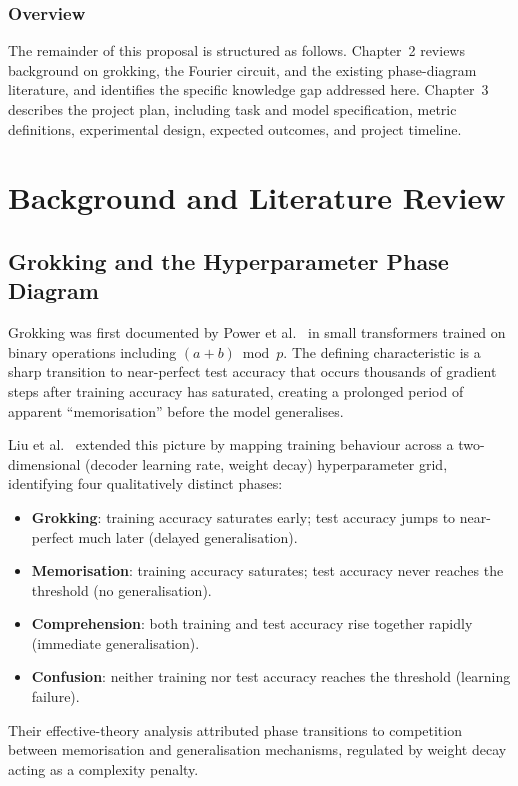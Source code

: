 \documentclass[12pt,openany,a4paper]{book}
\begin{document}
\subsection{Overview}

The remainder of this proposal is structured as follows.
Chapter~2 reviews background on grokking, the Fourier circuit, and
the existing phase-diagram literature, and identifies the specific
knowledge gap addressed here.
Chapter~3 describes the project plan, including task and model
specification, metric definitions, experimental design, expected
outcomes, and project timeline.

\chapter{Background and Literature Review}

\section{Grokking and the Hyperparameter Phase Diagram}

Grokking was first documented by Power et al.\ \cite{power2022grokking}
in small transformers trained on binary operations including
$(a+b)\bmod p$.
The defining characteristic is a sharp transition to near-perfect test
accuracy that occurs thousands of gradient steps after training
accuracy has saturated, creating a prolonged period of apparent
``memorisation'' before the model generalises.

Liu et al.\ \cite{liu2022towards} extended this picture by mapping
training behaviour across a two-dimensional (decoder learning rate,
weight decay) hyperparameter grid, identifying four qualitatively
distinct phases:
\begin{itemize}
  \item \textbf{Grokking}: training accuracy saturates early; test
    accuracy jumps to near-perfect much later (delayed generalisation).
  \item \textbf{Memorisation}: training accuracy saturates; test
    accuracy never reaches the threshold (no generalisation).
  \item \textbf{Comprehension}: both training and test accuracy rise
    together rapidly (immediate generalisation).
  \item \textbf{Confusion}: neither training nor test accuracy reaches
    the threshold (learning failure).
\end{itemize}
Their effective-theory analysis attributed phase transitions to
competition between memorisation and generalisation mechanisms,
regulated by weight decay acting as a complexity penalty.
\end{document}
